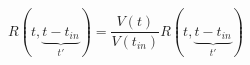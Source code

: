 \begin{equation}
R(t,\underbrace{t-t_{in}}_{t'})=\frac{V(t)}{V(t_{in})} R(t,\underbrace{t-t_{in}}_{t'})
\end{equation}
